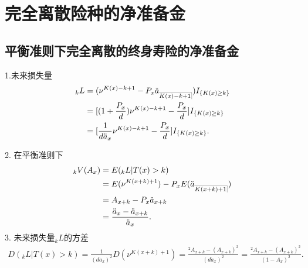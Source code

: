 \documentclass[lang=cn,10pt]{elegantbook}
\makeatletter
\DeclareRobustCommand{\annu}[1]{_{%
    \def\arraystretch{0}%
    \setlength\arraycolsep{1pt}%
    \setlength\arrayrulewidth{.2pt}%
    \begin{array}[b]{@{}c|}\hline
        \\[\arraycolsep]%
        \scriptstyle #1%
    \end{array}%
}}
\makeatother
\begin{document}
\section{完全离散险种的净准备金}
\subsection{平衡准则下完全离散的终身寿险的净准备金}
\begin{proposition}
    1.未来损失量
    \begin{align*}
        {}_kL & = (\nu^{K(x)-k+1}-P_x \ddot a_{\annu {K(x)-k+1}} )I_{\{K(x)\ge k\}}      \\
              & = [ (1+\frac{P_x }{d} )\nu^{K(x)-k+1}-\frac{P_x}{d} ] I_{\{K(x)\ge k\}}  \\
              & = [\frac{1}{d\ddot a_x}\nu^{K(x)-k+1}-\frac{P_x }{d} ]I_{\{K(x)\ge k\}}.
    \end{align*}

    2. 在平衡准则下
    \begin{align*}
        {}_kV(A_x) & =E({}_kL|T(x)>k)                                         \\
                   & =E (\nu^{K(x+k)+1} )-P_x E (\ddot a_{\annu {K(x+k)+1}} ) \\
                   & = A_{x+k}-P_x\ddot a_{x+k}                               \\
                   & =\frac{\ddot a_x-\ddot a_{x+k}}{\ddot a_x}.
    \end{align*}
    3. 未来损失量$_kL$的方差
    \begin{align*}
        D(_kL|T(x)>k) =\frac{1}{(d\ddot a_x)^2}D(\nu^{K(x+k)+1}) = \frac{{}^2 A_{x+k}-( A_{x+k})^2}{(d\ddot a_x)^2}=\frac{{}^2 A_{x+k}-( A_{x+k})^2}{(1-A_x)^2}.  \end{align*}
\end{proposition}
\end{document}
